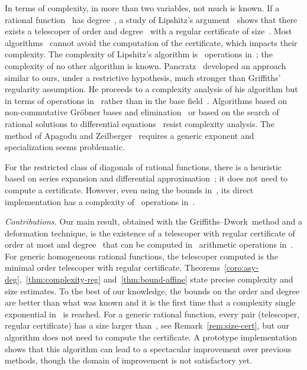 \documentclass{sig-alternate}
\newcommand{\GD}{Griffiths--Dwork}
\begin{document}
In terms of complexity, in more than two variables, not 
much is known.
If a rational function~ has degree~, a study of Lipshitz's argument~\cite{Lip88} shows that there exists a telescoper of order and degree~ with a regular certificate of size~.
Most algorithms~\cite{Lip88,Zei90,Takayama1990a,Chy00,ApaZei06,Kou10} cannot avoid the computation of the certificate, which impacts their complexity.
The complexity of Lipshitz's algorithm is~ operations in~; the complexity of no other algorithm is known.
Pancratz~\cite{Pan10} developed an approach similar to ours, under a restrictive hypothesis, much stronger than Griffiths' regularity assumption.
He proceeds to a complexity analysis of his algorithm but in terms of operations in~ rather than in the base field~.
Algorithms based on non-commutative Gröbner bases and elimination~\cite{Zei90,Takayama1990a} or based on the search of rational solutions to differential equations~\cite{Chy00} resist complexity analysis.
The method of Apagodu and Zeilberger~\cite{ApaZei06} requires a generic exponent and specialization seems problematic.

For the restricted class of diagonals of rational functions, there is a heuristic based on series expansion and differential approximation~\cite{KauZei11}; it does not need to compute a certificate.
However, even using the bounds in~, its direct implementation has a complexity of~ operations in~.




\medskip
\noindent\emph{Contributions.}
Our main result, obtained with the \GD\ method and a deformation technique, is the existence of a telescoper with regular certificate of order at most  and degree~ that can be computed in~ arithmetic operations in~.
For generic homogeneous rational functions, the telescoper computed is the minimal order telescoper with regular certificate.
Theorems~\ref{coro:asy-deg},~\ref{thm:complexity-reg} and~\ref{thm:bound-affine} state precise complexity and size estimates. 
To the best of our knowledge, the bounds on the order and degree are better than what was known and it is the first time that a complexity single exponential in~ is reached.
For a generic rational function, every pair (telescoper, regular certificate) has a size larger than~, see Remark~\ref{rem:size-cert}, but our algorithm does not need to compute the certificate.
A prototype implementation shows that this algorithm can lead
to a spectacular improvement over previous methods, though the domain of improvement is not  satisfactory yet.
\end{document}
